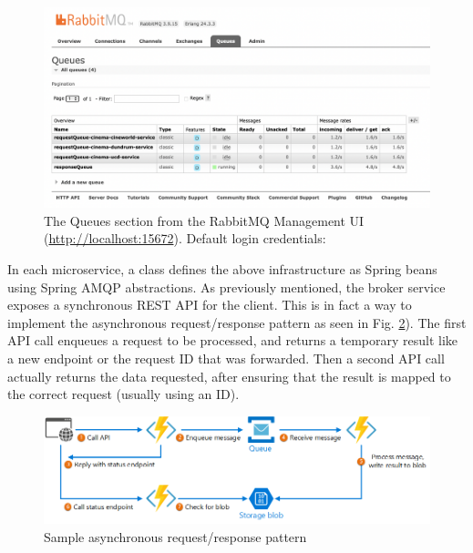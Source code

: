 \begin{figure}[H]
	\centering
	\includegraphics[width=1.0\linewidth]{./assets/images/case-studies/rmq-management.png}
	\caption{The Queues section from the RabbitMQ Management UI (\url{http://localhost:15672}). Default login credentials: }
	\label{fig:rmq-management}
\end{figure}

In each microservice, a   class defines the above infrastructure as Spring beans using Spring AMQP abstractions. As previously mentioned, the broker service exposes a synchronous REST API for the client. This is in fact a way to implement the asynchronous request/response pattern as seen in Fig. \ref{fig:async-req-res}). The first API call enqueues a request to be processed, and returns a temporary result like a new endpoint or the request ID that was forwarded. Then a second API call actually returns the data requested, after ensuring that the result is mapped to the correct request (usually using an ID).

\begin{figure}[H]
	\centering
	\includegraphics[width=0.8\linewidth]{./assets/images/case-studies/async-req-res.png}
	\caption{Sample asynchronous request/response pattern}
	\label{fig:async-req-res}
\end{figure}

